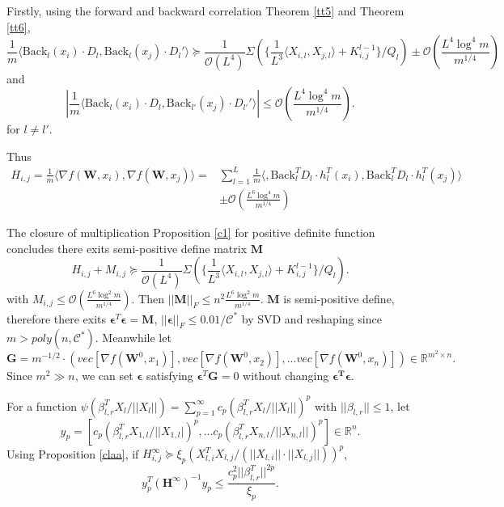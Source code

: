\documentclass{article}
\newcommand{\cO}{\mathcal{O}}
\begin{document}
Firstly, using the forward and backward correlation Theorem \ref{tt5} and Theorem \ref{tt6},
\begin{equation}
\frac{1}{m}\langle \text{Back}_l(x_i)\cdot D_l,\text{Back}_{l}(x_j)\cdot D_{l}' \rangle \succeq \frac{1}{\cO(L^4)}\Sigma( \{\frac{1}{L^3}\langle X_{i,l}, X_{j,l} \rangle +K^{l-1}_{i,j}\}/Q_l)\pm \cO(\frac{L^4\log^4 m}{m^{1/4}})
\end{equation}
and
\begin{equation}
|\frac{1}{m}\langle \text{Back}_l(x_i)\cdot D_l,\text{Back}_{l'}(x_j)\cdot D_{l'}' \rangle| \leq \cO(\frac{L^4\log^4 m}{m^{1/4}}).
\end{equation}
for $l\neq l'$.

Thus
\begin{equation}
\begin{aligned}
H_{i,j}=\frac{1}{m}\langle \nabla f(\bm{W},x_i), \nabla f(\bm{W},x_j)\rangle= &\sum_{l=1}^L\frac{1}{m} \langle, \text{Back}^T_lD_l\cdot h_l^T(x_i), \text{Back}^T_lD_l\cdot h_l^T(x_j)\rangle \\
& \pm \cO(\frac{L^6\log^4 m}{m^{1/4}})
\end{aligned}
\end{equation}

The closure of multiplication Proposition \ref{c1} for positive definite function concludes there exits semi-positive define matrix $\bm{M}$
\begin{equation}
H_{i,j} +M_{i,j} \succeq \frac{1}{\cO(L^4)}\Sigma( \{\frac{1}{L^3}\langle X_{i,l}, X_{j,l} \rangle +K^{l-1}_{i,j}\}/Q_l).
\end{equation}
with $M_{i,j}\leq \cO(\frac {L^6\log^2 m}{m^{1/4}})$. Then $||\bm{M}||_F \leq n^2\frac{L^6\log^2m}{m^{1/4}}$.   $\bm {M} $ is semi-positive define, therefore there exits $\bm{\epsilon}^T \bm{\epsilon }=\bm{M}$,  $||\bm {\epsilon} ||_F \leq 0.01/\mathscr{C}^*$ by SVD and reshaping since  $m>poly(n,\mathscr{C}^*)$. Meanwhile  let $$\bm{G}=m^{-1/2}\cdot (vec[\nabla f(\bm{W}^0,x_1)], vec[\nabla f(\bm{W}^0,x_2)],... vec[\nabla f(\bm{W}^0,x_n)])\in \mathbb{R}^{m^2\times n}.$$ Since $m^2\gg n$,  we can set $\bm{\epsilon}$ satisfying  $\bm{\epsilon}^T \bm{G} =0$ without changing $\bm{\epsilon^T\epsilon}$.

For  a function $\psi(\beta^T_{l,r}X_l/||X_{l}||)=\sum_{p=1}^\infty c_p (\beta^T_{l,r}X_l/||X_{l}||)^{p}$ with $||\beta_{l,r}||\leq 1$, let
\begin{equation}
y_p=[c_p (\beta^T_{l,r}X_{1,l}/||X_{1,l}|)^{p},...c_p(\beta^T_{l,r}X_{n,l}/||X_{n,l}||)^{p}]\in \mathbb{R}^n.
\end{equation}
Using Proposition \ref{claa}, if  $H^\infty_{i,j}\succeq \xi_p(X_{l,i}^T X_{l,j}/(||X_{l,i}||\cdot ||X_{l,j}||))^{p}$,
 $$y_p^T(\bm{H}^\infty)^{-1}y_p\leq \frac{c^2_p||\beta^T_{l,r}||^{2p}}{\xi_p}.$$
\end{document}
